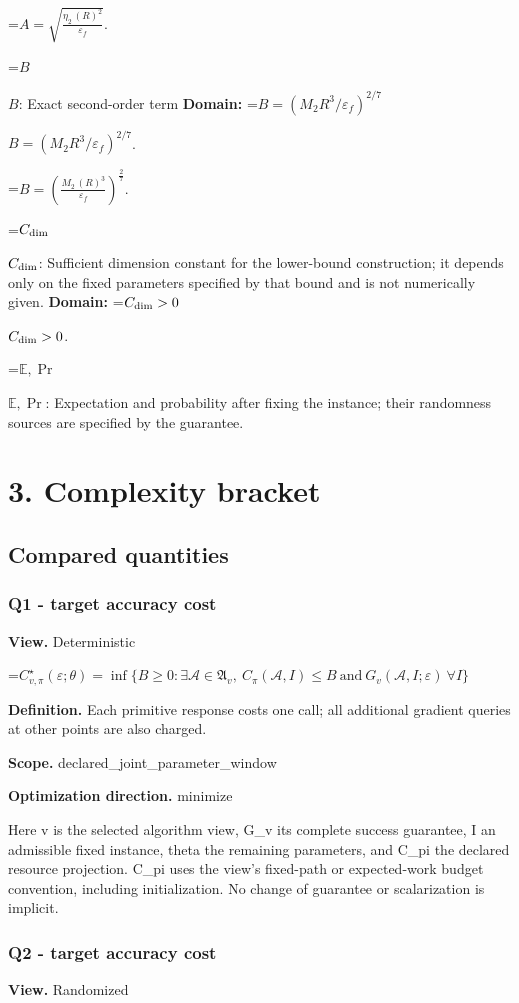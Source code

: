 \documentclass[10pt,a4paper]{article}
\newcommand{\AtlasMath}[1]{\par\begingroup\centering\setbox0=\hbox{$\displaystyle #1$}\ifdim\wd0>1.4\linewidth\typeout{ATLAS WIDE FORMULA: \the\wd0}\fi\ifdim\wd0>\linewidth\resizebox{\linewidth}{!}{\box0}\else\box0\fi\par\endgroup}
\newcommand{\AtlasInlineMath}[1]{\begingroup\setbox0=\hbox{$#1$}\ifdim\wd0>.4\linewidth\endgroup\AtlasMath{#1}\else\endgroup$#1$\fi}
\begin{document}
\AtlasMath{A=\sqrt{\frac{\eta_2\,(R)^{2}}{\varepsilon_f}}.}


\AtlasInlineMath{B}: Exact second-order term \textbf{Domain:} \AtlasInlineMath{B=(M_2R^3/\varepsilon_f)^{2/7}}.


\AtlasMath{B=(\frac{M_2\,(R)^{3}}{\varepsilon_f})^{\frac{2}{7}}.}


\AtlasInlineMath{C_{\rm dim}}: Sufficient dimension constant for the lower-bound construction; it depends only on the fixed parameters specified by that bound and is not numerically given. \textbf{Domain:} \AtlasInlineMath{C_{\rm dim}>0}.

\AtlasInlineMath{\mathbb{E},\Pr}: Expectation and probability after fixing the instance; their randomness sources are specified by the guarantee.

\section{3. Complexity bracket}
\subsection{Compared quantities}
\subsubsection{Q1 - target accuracy cost}
\textbf{View.} Deterministic

\AtlasMath{C^\star_{v,\pi}(\varepsilon;\theta)=\inf\{B\ge0:\exists\mathcal A\in\mathfrak A_v,\ C_\pi(\mathcal A,I)\le B\ \text{and}\ G_v(\mathcal A,I;\varepsilon)\ \forall I\}}
\textbf{Definition.} Each primitive response costs one call; all additional gradient queries at other points are also charged.

\textbf{Scope.} declared\_joint\_parameter\_window

\textbf{Optimization direction.} minimize

Here v is the selected algorithm view, G\_v its complete success guarantee, I an admissible fixed instance, theta the remaining parameters, and C\_pi the declared resource projection. C\_pi uses the view's fixed-path or expected-work budget convention, including initialization. No change of guarantee or scalarization is implicit.

\subsubsection{Q2 - target accuracy cost}
\textbf{View.} Randomized
\end{document}
